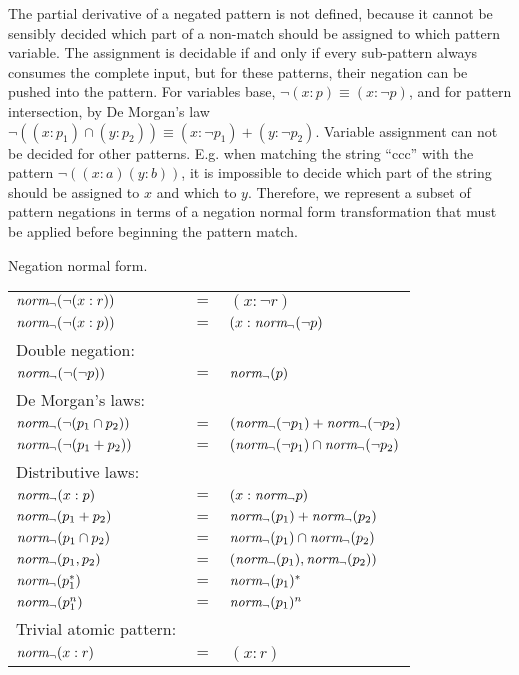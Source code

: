 The partial derivative of a negated pattern is not defined, because it cannot
be sensibly decided which part of a non-match should be assigned to which
pattern variable. The assignment is decidable if and only if every sub-pattern
always consumes the complete input, but for these patterns, their negation can
be pushed into the pattern. For variables base, $\neg(x:p) \equiv (x:\neg p)$,
and for pattern intersection, by De Morgan's law $\neg((x:p_1) \cap (y:p_2))
\equiv (x:\neg p_1) + (y:\neg p_2)$. Variable assignment can not be decided
for other patterns. E.g. when matching the string ``ccc'' with the pattern
$\neg((x:a)(y:b))$, it is impossible to decide which part of the string should
be assigned to $x$ and which to $y$. Therefore, we represent a subset of
pattern negations in terms of a negation normal form transformation that must
be applied before beginning the pattern match.

\needspace{6cm}

\begin{defn}
   \label{defn-negnorm}
   Negation normal form.

   \begin{tabular}{lll}
      $\mathit{norm_\neg}(\neg(x : r))$		& $=$	& $(x : \neg r)$					\\
      $\mathit{norm_\neg}(\neg(x : p))$		& $=$	& $(x : \mathit{norm_\neg}(\neg p)$				\\
      Double negation:			&	&							\\
      $\mathit{norm_\neg}(\neg(\neg p))$		& $=$	& $\mathit{norm_\neg}(p)$						\\
      De Morgan's laws:			&	&							\\
      $\mathit{norm_\neg}(\neg(p_1 \cap p_2))$	& $=$	& $(\mathit{norm_\neg}(\neg p_1) + \mathit{norm_\neg}(\neg p_2)$		\\
      $\mathit{norm_\neg}(\neg(p_1 + p_2))$	& $=$	& $(\mathit{norm_\neg}(\neg p_1) \cap \mathit{norm_\neg}(\neg p_2)$		\\
      Distributive laws:		&	&							\\
      $\mathit{norm_\neg}(x : p)$			& $=$	& $(x : \mathit{norm_\neg} p)$					\\
      $\mathit{norm_\neg}(p_1 + p_2)$		& $=$	& $\mathit{norm_\neg}(p_1) + \mathit{norm_\neg}(p_2)$			\\
      $\mathit{norm_\neg}(p_1 \cap p_2)$		& $=$	& $\mathit{norm_\neg}(p_1) \cap \mathit{norm_\neg}(p_2)$			\\
      $\mathit{norm_\neg}(p_1, p_2)$		& $=$	& $(\mathit{norm_\neg}(p_1), \mathit{norm_\neg}(p_2))$			\\
      $\mathit{norm_\neg}(p_1^*)$			& $=$	& $\mathit{norm_\neg}(p_1)^*$					\\
      $\mathit{norm_\neg}(p_1^n)$			& $=$	& $\mathit{norm_\neg}(p_1)^n$					\\
      Trivial atomic pattern:		&	&							\\
      $\mathit{norm_\neg}(x : r)$			& $=$	& $(x : r)$						\\
   \end{tabular}
\end{defn}

